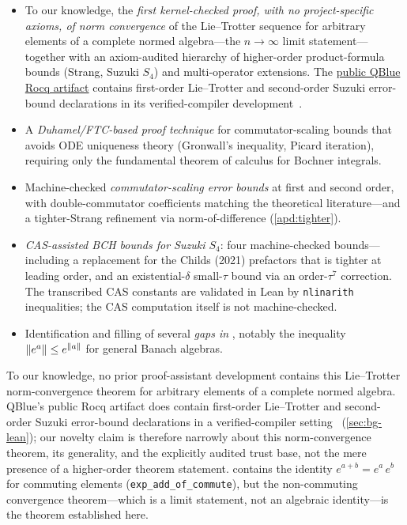 \begin{itemize}
  \item To our knowledge, the \emph{first kernel-checked proof, with no
    project-specific axioms, of norm convergence} of the Lie--Trotter sequence
    for arbitrary elements of a complete normed algebra---the $n \to \infty$
    limit statement---together with an axiom-audited hierarchy of higher-order
    product-formula bounds (Strang, Suzuki $S_4$) and multi-operator
    extensions. The \href{https://doi.org/10.5281/zenodo.15852130}{public QBlue
    Rocq artifact} contains first-order Lie--Trotter and second-order Suzuki
    error-bound declarations in its verified-compiler development~\cite{liVerifiedCompilerQuantum2025}.

  \item A \emph{Duhamel/FTC-based proof technique} for commutator-scaling bounds
    that avoids ODE uniqueness theory (Gronwall's inequality, Picard iteration),
    requiring only the fundamental theorem of calculus for Bochner integrals.

  \item Machine-checked \emph{commutator-scaling error bounds} at first and
    second order, with double-commutator coefficients matching the
    theoretical literature---and a tighter-Strang refinement
    via norm-of-difference (\cref{apd:tighter}).

  \item \emph{CAS-assisted BCH bounds for Suzuki $S_4$}: four machine-checked
    bounds---including a replacement for the Childs (2021) prefactors that
    is tighter at leading order, and an existential-$\delta$ small-$\tau$
    bound via an order-$\tau^7$ correction. The transcribed CAS constants
    are validated in Lean by \texttt{nlinarith} inequalities; the CAS
    computation itself is not machine-checked.

  \item Identification and filling of several \emph{gaps in \Mathlib}, notably
    the inequality $\left\|e^a\right\| \le e^{\left\|a\right\|}$ for general Banach algebras.
\end{itemize}

To our knowledge, no prior proof-assistant development contains this
Lie--Trotter norm-convergence theorem for arbitrary elements of a complete
normed algebra. QBlue's public Rocq artifact does contain first-order
Lie--Trotter and second-order Suzuki error-bound declarations in a
verified-compiler setting~\cite{liVerifiedCompilerQuantum2025}
(\cref{sec:bg-lean}); our novelty claim is therefore narrowly about this
norm-convergence theorem, its generality, and the explicitly audited trust
base, not the mere presence of a higher-order theorem statement.
\Mathlib contains the identity $e^{a+b} = e^a\,e^b$ for commuting elements
(\texttt{exp\_add\_of\_commute}), but the non-commuting convergence
theorem---which is a limit statement, not an algebraic identity---is the
theorem established here.

